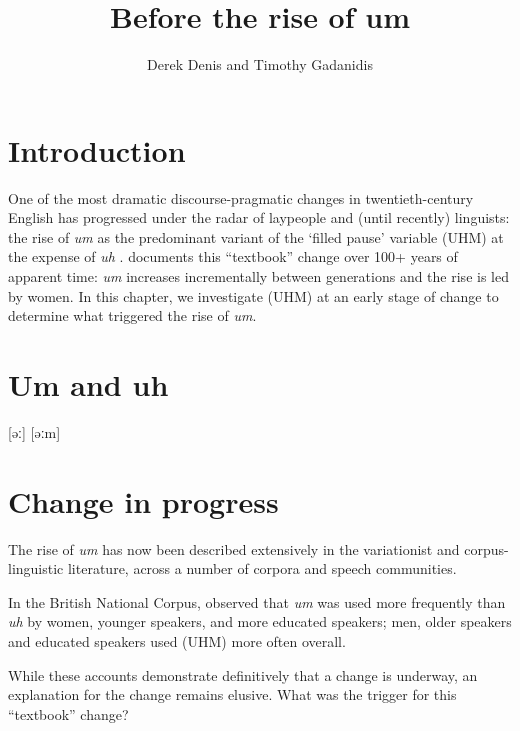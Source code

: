 \documentclass{article}
\title{Before the rise of um}
\author{Derek Denis and Timothy Gadanidis}
\begin{document}
\maketitle

\section{Introduction}


One of the most dramatic discourse-pragmatic changes in twentieth-century
English has progressed under the radar of laypeople and (until recently)
linguists: the rise of \emph{um} as the predominant variant of the `filled
pause' variable (UHM) at the expense of \emph{uh} \parencite{tottie2011,
fruehwald2016, wielingetal2016}.
\textcite[43]{fruehwald2016} documents this ``textbook'' change over 100+ years
of apparent time:
\emph{um} increases incrementally between generations and the rise is led by
women.
In this chapter, we investigate (UHM) at an early stage of change to determine
what triggered the rise of \emph{um}.

\section{Um and uh}


[əː] [əːm]

\section{Change in progress}

The rise of \emph{um} has now been described extensively in the variationist and
corpus-linguistic literature, across a number of corpora and speech communities.


In the British National Corpus, \textcite{tottie2011} observed that \emph{um}
was used more frequently than \emph{uh} by women, younger speakers, and more
educated speakers; men, older speakers and educated speakers used (UHM) more
often overall.
\textcite{fruehwald2016}


While these accounts demonstrate definitively that a change is underway, an
explanation for the change remains elusive.
What was the trigger for this ``textbook'' change?
\end{document}
